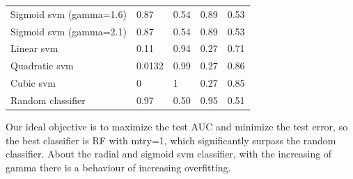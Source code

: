 \documentclass{article}
\begin{document}
\begin{table}[H]
\begin{tabular}{lllll}
Sigmoid svm (gamma=1.6) & 0.87                & 0.54         & 0.89            & 0.53     \\
Sigmoid svm (gamma=2.1) & 0.87                & 0.54         & 0.89            & 0.53     \\
Linear svm               & 0.11                & 0.94         & 0.27            & 0.71     \\
Quadratic svm            & 0.0132              & 0.99         & 0.27            & 0.86     \\
Cubic svm                & 0                   & 1            & 0.27            & 0.85     \\
Random classifier        & 0.97                & 0.50          & 0.95            & 0.51     
\end{tabular}
\end{table}
Our ideal objective is to maximize the test AUC and minimize the test error, so the best classifier is RF with mtry=1, which significantly surpass the random classifier.  About the radial and sigmoid svm classifier, with the increasing of gamma there is a behaviour of increasing overfitting.




\end{document}
